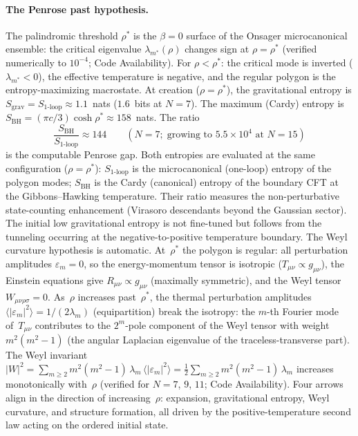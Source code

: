 \paragraph{The Penrose past hypothesis.}
The palindromic threshold $\rho^*$ is the $\beta = 0$
surface of the Onsager microcanonical ensemble:
the critical eigenvalue $\lambda_{m^*}(\rho)$ changes
sign at $\rho = \rho^*$ (verified numerically to
$10^{-4}$; Code Availability).
For $\rho < \rho^*$: the critical mode is inverted
($\lambda_{m^*} < 0$), the effective temperature
is negative, and the regular polygon is the
entropy-maximizing macrostate.
At creation ($\rho = \rho^*$), the gravitational
entropy is
$S_{\mathrm{grav}} = S_{\mathrm{1\text{-}loop}}
\approx 1.1$~nats ($1.6$~bits at $N = 7$).
The maximum (Cardy) entropy is
$S_{\mathrm{BH}} = (\pi c/3)\cosh\rho^* \approx 158$~nats.
The ratio
\begin{equation}\label{eq:penrose-gap}
  \frac{S_{\mathrm{BH}}}{S_{\mathrm{1\text{-}loop}}}
  \approx 144
  \qquad (N = 7;\; \text{growing to } 5.5 \times 10^4
  \text{ at } N = 15)
\end{equation}
is the computable Penrose gap.
Both entropies are evaluated at the same configuration
($\rho = \rho^*$): $S_{\mathrm{1\text{-}loop}}$ is the
microcanonical (one-loop) entropy of the polygon modes;
$S_{\mathrm{BH}}$ is the Cardy (canonical) entropy of the
boundary CFT at the Gibbons--Hawking temperature.
Their ratio measures the non-perturbative state-counting
enhancement (Virasoro descendants beyond the Gaussian sector).
The initial low gravitational entropy is not fine-tuned but
follows from the tunneling occurring at the
negative-to-positive temperature boundary.
The Weyl curvature hypothesis \citep{Penrose1979} is
automatic.
At~$\rho^*$ the polygon is regular: all perturbation
amplitudes $\varepsilon_m = 0$, so the
energy-momentum tensor is isotropic
($T_{\mu\nu} \propto g_{\mu\nu}$),
the Einstein equations give
$R_{\mu\nu} \propto g_{\mu\nu}$
(maximally symmetric), and the Weyl tensor
$W_{\mu\nu\rho\sigma} = 0$.
As~$\rho$ increases past~$\rho^*$, the thermal
perturbation amplitudes
$\langle|\varepsilon_m|^2\rangle = 1/(2\lambda_m)$
(equipartition) break the isotropy: the $m$-th
Fourier mode of~$T_{\mu\nu}$ contributes to the
$2^m$-pole component of the Weyl tensor with weight
$m^2(m^2{-}1)$ (the angular Laplacian eigenvalue
of the traceless-transverse part).
The Weyl invariant
$|W|^2 = \sum_{m \ge 2} m^2(m^2{-}1)\,
\lambda_m\,\langle|\varepsilon_m|^2\rangle
= \tfrac{1}{2}\sum_{m \ge 2} m^2(m^2{-}1)\,\lambda_m$
increases monotonically with~$\rho$
(verified for $N = 7$, $9$, $11$; Code Availability).
Four arrows align in the direction of
increasing~$\rho$: expansion, gravitational entropy,
Weyl curvature, and structure formation, all driven
by the positive-temperature second law acting on
the ordered initial state.


